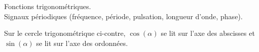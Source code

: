 \begin{prerequis}
	Fonctions trigonométriques. \\
	Signaux périodiques (fréquence, période, pulsation, longueur d'onde, phase).
\end{prerequis}








\hauteurLargeurCadreReponse		{8mm}{3cm}
\initialisationEntrainement


                                \initialisationPartieGauche %
Sur le cercle trigonométrique ci-contre, $\cos(\alpha)$ se lit sur l'axe des abscisses et $\sin(\alpha)$ se lit sur l'axe des ordonnées. 


